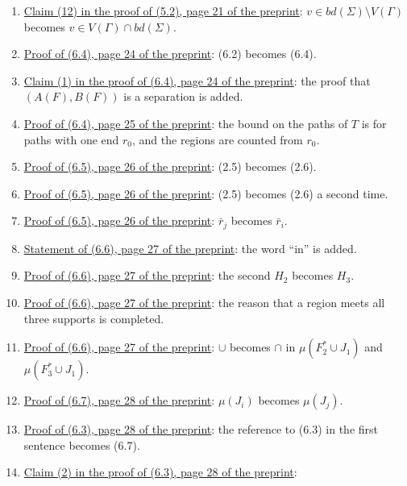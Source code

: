 \begin{enumerate}
becomes (3.5).
\item {}\hyperref[fix:5.2-claim12]{Claim (12) in the proof of (5.2), page 21 of the preprint}:
$v \in bd(\Sigma) \setminus V(\Gamma)$ becomes $v \in V(\Gamma) \cap bd(\Sigma)$.
\item {}\hyperref[fix:6.4-proof]{Proof of (6.4), page 24 of the preprint}: (6.2) becomes (6.4).
\item {}\hyperref[fix:6.4-claim1-proof-added]{Claim (1) in the proof of (6.4), page 24 of the preprint}: the proof that $(A(F), B(F))$ is a separation is added.
\item {}\hyperref[fix:6.4-tree]{Proof of (6.4), page 25 of the preprint}: the bound on the paths
of $T$ is for paths with one end $r_0$, and the regions are counted from $r_0$.
\item {}\hyperref[fix:6.5-n]{Proof of (6.5), page 26 of the preprint}: (2.5) becomes (2.6).
\item {}\hyperref[fix:6.5-t]{Proof of (6.5), page 26 of the preprint}: (2.5) becomes (2.6) a second time.
\item {}\hyperref[fix:6.5-disc]{Proof of (6.5), page 26 of the preprint}: $\bar{r}_j$ becomes
$\bar{r}_i$.
\item {}\hyperref[fix:6.6]{Statement of (6.6), page 27 of the preprint}: the word ``in'' is added.
\item {}\hyperref[fix:6.6-proof-H3]{Proof of (6.6), page 27 of the preprint}: the second $H_2$
becomes $H_3$.
\item {}\hyperref[fix:6.6-proof-region]{Proof of (6.6), page 27 of the preprint}: the reason that
a region meets all three supports is completed.
\item {}\hyperref[fix:6.6-proof-Delta1]{Proof of (6.6), page 27 of the preprint}: $\cup$ becomes
$\cap$ in $\mu(F_2^* \cup J_1)$ and $\mu(F_3^* \cup J_1)$.
\item {}\hyperref[fix:6.7-proof]{Proof of (6.7), page 28 of the preprint}: $\mu(J_i)$ becomes
$\mu(J_j)$.
\item {}\hyperref[fix:6.3-proof]{Proof of (6.3), page 28 of the preprint}: the reference to (6.3)
in the first sentence becomes (6.7).
\item {}\hyperref[fix:6.3-claim2-ends]{Claim (2) in the proof of (6.3), page 28 of the preprint}:

\end{enumerate}
